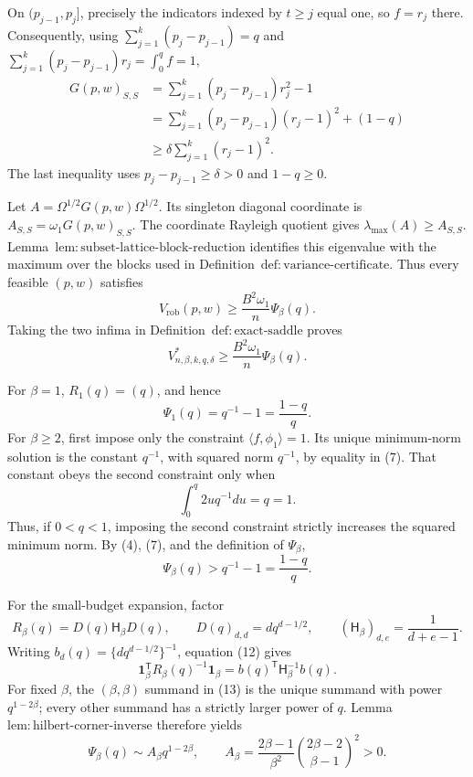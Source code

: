 On \((p_{j-1},p_j]\), precisely the indicators indexed by \(t\ge j\) equal one, so \(f=r_j\) there.  Consequently, using \(\sum_{j=1}^k(p_j-p_{j-1})=q\) and \(\sum_{j=1}^k(p_j-p_{j-1})r_j=\int_0^qf=1\),
\[
\begin{aligned}
G(p,w)_{S,S}
&=\sum_{j=1}^k(p_j-p_{j-1})r_j^2-1\\
&=\sum_{j=1}^k(p_j-p_{j-1})(r_j-1)^2+(1-q)\\
&\ge \delta\sum_{j=1}^k(r_j-1)^2.
\end{aligned}
\tag{8}
\]
The last inequality uses \(p_j-p_{j-1}\ge\delta>0\) and \(1-q\ge0\).

Let \(A=\Omega^{1/2}G(p,w)\Omega^{1/2}\).  Its singleton diagonal coordinate is \(A_{S,S}=\omega_1G(p,w)_{S,S}\).  The coordinate Rayleigh quotient gives \(\lambda_{\max}(A)\ge A_{S,S}\).  Lemma~\(\mathrm{lem{:}subset\text{-}lattice\text{-}block\text{-}reduction}\) identifies this eigenvalue with the maximum over the blocks used in Definition~\(\mathrm{def{:}variance\text{-}certificate}\).  Thus every feasible \((p,w)\) satisfies
\[
V_{\mathrm{rob}}(p,w)
\ge \frac{B^2\omega_1}{n}\Psi_\beta(q).
\]
Taking the two infima in Definition~\(\mathrm{def{:}exact\text{-}saddle}\) proves
\[
V^*_{n,\beta,k,q,\delta}
\ge \frac{B^2\omega_1}{n}\Psi_\beta(q).
\tag{9}
\]

For \(\beta=1\), \(R_1(q)=(q)\), and hence
\[
\Psi_1(q)=q^{-1}-1=\frac{1-q}{q}.
\tag{10}
\]
For \(\beta\ge2\), first impose only the constraint \(\langle f,\phi_1\rangle=1\).  Its unique minimum-norm solution is the constant \(q^{-1}\), with squared norm \(q^{-1}\), by equality in (7).  That constant obeys the second constraint only when
\[
\int_0^q2u q^{-1}du=q=1.
\]
Thus, if \(0<q<1\), imposing the second constraint strictly increases the squared minimum norm.  By (4), (7), and the definition of \(\Psi_\beta\),
\[
\Psi_\beta(q)>q^{-1}-1=\frac{1-q}{q}.
\tag{11}
\]

For the small-budget expansion, factor
\[
R_\beta(q)=D(q)\mathsf H_\beta D(q),
\qquad D(q)_{d,d}=d q^{d-1/2},
\qquad (\mathsf H_\beta)_{d,e}=\frac{1}{d+e-1}.
\tag{12}
\]
Writing \(b_d(q)=\{d q^{d-1/2}\}^{-1}\), equation (12) gives
\[
\mathbf 1_\beta^{\mathsf T}R_\beta(q)^{-1}\mathbf 1_\beta
=b(q)^{\mathsf T}\mathsf H_\beta^{-1}b(q).
\tag{13}
\]
For fixed \(\beta\), the \((\beta,\beta)\) summand in (13) is the unique summand with power \(q^{1-2\beta}\); every other summand has a strictly larger power of \(q\).  Lemma~\(\mathrm{lem{:}hilbert\text{-}corner\text{-}inverse}\) therefore yields
\[
\Psi_\beta(q)
\sim A_\beta q^{1-2\beta},
\qquad
A_\beta=\frac{2\beta-1}{\beta^2}
\binom{2\beta-2}{\beta-1}^{\!2}>0.
\tag{14}
\]

